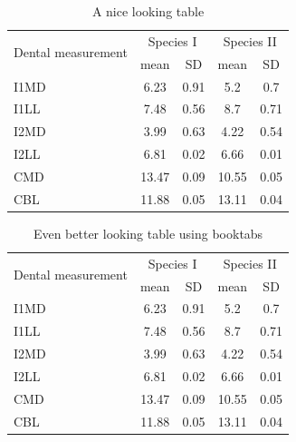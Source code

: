 \documentclass[a4paper,12pt,times,print,index, custombib]{PhDThesisPSnPDF}\usepackage[]{graphicx}\usepackage[]{color}
\begin{document}
\begin{table}
\caption{A nice looking table}
\centering
\label{table:nice_table}
\begin{tabular}{l c c c c}
\hline 
\multirow{2}{*}{Dental measurement} & \multicolumn{2}{c}{Species I} & \multicolumn{2}{c}{Species II} \\ 
\cline{2-5}
  & mean & SD  & mean & SD  \\ 
\hline
I1MD & 6.23 & 0.91 & 5.2  & 0.7  \\

I1LL & 7.48 & 0.56 & 8.7  & 0.71 \\

I2MD & 3.99 & 0.63 & 4.22 & 0.54 \\

I2LL & 6.81 & 0.02 & 6.66 & 0.01 \\

CMD & 13.47 & 0.09 & 10.55 & 0.05 \\

CBL & 11.88 & 0.05 & 13.11 & 0.04\\ 
\hline 
\end{tabular}
\end{table}


\begin{table}
\caption{Even better looking table using booktabs}
\centering
\label{table:good_table}
\begin{tabular}{l c c c c}
\toprule
\multirow{2}{*}{Dental measurement} & \multicolumn{2}{c}{Species I} & \multicolumn{2}{c}{Species II} \\ 
\cmidrule{2-5}
  & mean & SD  & mean & SD  \\ 
\midrule
I1MD & 6.23 & 0.91 & 5.2  & 0.7  \\

I1LL & 7.48 & 0.56 & 8.7  & 0.71 \\

I2MD & 3.99 & 0.63 & 4.22 & 0.54 \\

I2LL & 6.81 & 0.02 & 6.66 & 0.01 \\

CMD & 13.47 & 0.09 & 10.55 & 0.05 \\

CBL & 11.88 & 0.05 & 13.11 & 0.04\\ 
\bottomrule
\end{tabular}
\end{table}




\end{document}
